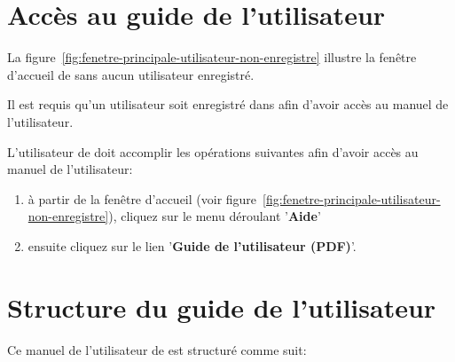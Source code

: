\section{Acc\`es au guide de l'utilisateur}

La figure~\ref{fig:fenetre-principale-utilisateur-non-enregistre}
illustre la fen\^etre d'accueil de \yeroth sans aucun utilisateur
enregistr\'e.

Il est requis qu'un utilisateur soit enregistr\'e
dans \yeroth afin d'avoir acc\`es au manuel de l'utilisateur.

L'utilisateur de \yeroth doit accomplir les op\'erations
suivantes afin d'avoir acc\`es au manuel de l'utilisateur:
\begin{enumerate}[1)]
	\item \`a partir de la fen\^etre d'accueil
		(voir figure~\ref{fig:fenetre-principale-utilisateur-non-enregistre}),
		cliquez sur le menu d\'eroulant '\textbf{Aide}'
	\item ensuite cliquez sur le lien '\textbf{Guide de l'utilisateur (PDF)}'.
\end{enumerate}

\section{Structure du guide de l'utilisateur}
Ce manuel de  l'utilisateur de \yeroth est structur\'e
comme suit:

